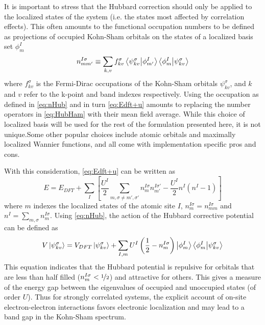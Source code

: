 \documentclass[12pt]{article}
\newcommand{\lrp}[1]{\left( #1 \right)}
\newcommand{\lrb}[1]{\left[ #1 \right]}
\begin{document}
It is important to stress that the Hubbard correction should only be applied to the localized states of the system (i.e. the states most affected by correlation effects). This often amounts to the functional occupation numbers to be defined as projections of occupied Kohn-Sham orbitals on the states of a localized basis set $\phi^I_{m}$
\begin{equation}\label{eq:nHub}
    n^{I\sigma}_{mm'} \equiv \sum_{k,v}f^\sigma_{kv}\bra{\psi^\sigma_{kv}}\ket{\phi^I_{m'}}\bra{\phi^I_{m}}\ket{\psi^\sigma_{kv}}
\end{equation}
where $f^\sigma_{kv}$ is the Fermi-Dirac occupations of the Kohn-Sham orbitals $\psi^\sigma_{kv}$, and $k$ and $v$ refer to the k-point and band indexes respectively. Using the occupation as defined in \eqref{eq:nHub} and in turn \eqref{eq:Edft+u} amounts to replacing the number operators in \eqref{eq:HubHam} with their mean field average. While this choice of localized basis will be used for the rest of the formulation presented here, it is not unique.Some other popular choices include atomic orbitals and maximally localized Wannier functions, and all come with implementation specific pros and cons. 

With this consideration, \eqref{eq:Edft+u} can be written as 
\begin{equation}
    E = E_{DFT} + \sum_I \lrb{\frac{U^I}{2}\sum_{m,\sigma\neq m',\sigma'}n_{m}^{I\sigma}n^{I\sigma'}_{m'}-\frac{U^I}{2}n^I(n^I-1)}
\end{equation}
where $m$ indexes the localized states of the atomic site $I$, $n_{m}^{I\sigma} = n_{mm}^{I\sigma}$ and $n^I = \sum_{m,\sigma}n_{m}^{I\sigma}$. Using \eqref{eq:nHub}, the action of the Hubbard corrective potential can be defined as 
\begin{equation}
    V\ket{\psi^\sigma_{kv}} = V_{DFT}\ket{\psi^\sigma_{kv}} + \sum_{I,m}U^I\lrp{\frac{1}{2}-n^{I\sigma}_m}\ket{\phi^I_{m}}\bra{\phi^I_{m}}\ket{\psi^\sigma_{kv}}
\end{equation}
This equation indicates that the Hubbard potential is repulsive for orbitals that are less than half filled ($n_m^{I\sigma}<\nicefrac{1}{2}$) and attractive for others. This gives a measure of the energy gap between the eigenvalues of occupied and unoccupied states (of order $U$). Thus for strongly correlated systems, the explicit account of on-site electron-electron interactions favors electronic localization and may lead to a band gap in the Kohn-Sham spectrum. 
\end{document}
